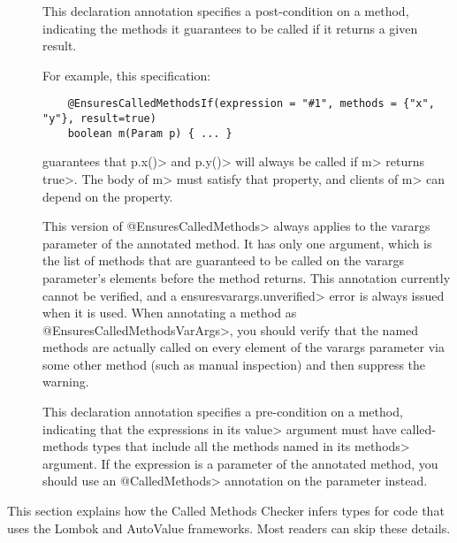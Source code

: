 \begin{description}
\item[]
  This declaration annotation specifies a post-condition on a method, indicating the methods it
  guarantees to be called if it returns a given result.

  For example, this specification:

  \begin{Verbatim}
    @EnsuresCalledMethodsIf(expression = "#1", methods = {"x", "y"}, result=true)
    boolean m(Param p) { ... }
  \end{Verbatim}

  guarantees that \<p.x()> and \<p.y()> will always be called if \<m> returns \<true>.
  The body of \<m> must satisfy that property, and clients of \<m> can depend on the property.

\item[]
  This version of \<@EnsuresCalledMethods> always applies to the varargs parameter of the
  annotated method. It has only one argument, which is the list of methods that are guaranteed
  to be called on the varargs parameter's elements before the method returns. This annotation
  currently cannot be verified, and a \<ensuresvarargs.unverified> error is always issued
  when it is used. When annotating a method as \<@EnsuresCalledMethodsVarArgs>, you should verify
  that the named methods are actually called on every element of the varargs parameter via some
  other method (such as manual inspection) and then suppress the warning.

\item[]
  This declaration annotation specifies a pre-condition on a method, indicating that the expressions
  in its \<value> argument must have called-methods types that include all the methods named
  in its \<methods> argument. If the expression is a parameter of the annotated method, you should
  use an \<@CalledMethods> annotation on the parameter instead.

\end{description}


This section explains how the Called Methods Checker infers types for code
that uses the Lombok and AutoValue frameworks. Most readers can skip these
details.

